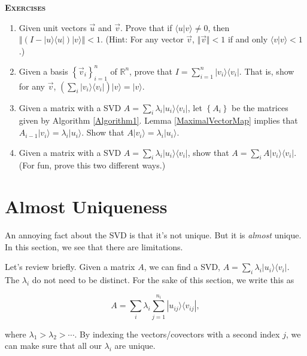 \documentclass{amsbook}
\begin{document}
{\bfseries\scshape\Large Exercises}

\begin{enumerate}
\item \label{Ex-Finish Projection} Given unit vectors $\vec u$ and $\vec v$.  Prove that if $\langle u|v\rangle\neq0$, then $\left\Vert\left(I-|u\rangle\langle u|\right)|v\rangle\right\Vert < 1$.  (Hint:  For any vector $\vec v $, $\Vert \vec v \Vert<1$ if and only $\langle  v | v \rangle<1$.)
\item \label{Ex-Outer Product Identity} Given a basis $\left\{\vec v_i\right\}_{i=1}^n$ of $\mathbb R^n$, prove that $I=\sum_{i=1}^n|v_i\rangle\langle v_i|$.  That is, show for any $\vec v$, $\left(\sum_i|v_i\rangle\langle v_i|\right)|v\rangle=|v\rangle$.
\item Given a matrix with a SVD $A=\sum_i\lambda_i|u_i\rangle\langle v_i|$, let $\left\{A_i\right\}$ be the matrices given by Algorithm \ref{Algorithm1}.  Lemma \ref{MaximalVectorMap} implies that $A_{i-1}|v_i\rangle=\lambda_i|u_i\rangle$.  Show that $A|v_i\rangle=\lambda_i|u_i\rangle$.
\item Given a matrix with a SVD $A=\sum_i\lambda_i|u_i\rangle\langle v_i|$, show that $A=\sum_iA|v_i\rangle\langle v_i|$.  (For fun, prove this two different ways.)
\end{enumerate}

\section{Almost Uniqueness}\label{Section-Almost Uniqueness}

An annoying fact about the SVD is that it's not unique.  But it is {\em almost} unique.  In this section, we see that there are limitations.

Let's review briefly.  Given a matrix $A$, we can find a SVD, $A=\sum_i\lambda_i|u_i\rangle\langle v_i|$.  The $\lambda_i$ do not need to be distinct.  For the sake of this section, we write this as 

\begin{equation}
\label{MultiLambdaNotation}
A=\sum_i\lambda_i\sum_{j=1}^{n_i}|u_{ij}\rangle\langle v_{ij}|,
\end{equation}

 where $\lambda_1>\lambda_2>\cdots$.  By indexing the vectors/covectors with a second index $j$, we can make sure that all our $\lambda_i$ are unique.
 
\end{document}
